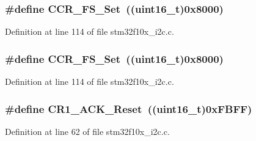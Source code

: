 \subsubsection[{\texorpdfstring{C\+C\+R\+\_\+\+F\+S\+\_\+\+Set}{CCR_FS_Set}}]{\setlength{\rightskip}{0pt plus 5cm}\#define C\+C\+R\+\_\+\+F\+S\+\_\+\+Set~(({\bf uint16\+\_\+t})0x8000)}\hypertarget{group___i2_c___private___defines_ga3af49180596b283514782708ac85606e}{}\label{group___i2_c___private___defines_ga3af49180596b283514782708ac85606e}


Definition at line 114 of file stm32f10x\+\_\+i2c.\+c.

\subsubsection[{\texorpdfstring{C\+C\+R\+\_\+\+F\+S\+\_\+\+Set}{CCR_FS_Set}}]{\setlength{\rightskip}{0pt plus 5cm}\#define C\+C\+R\+\_\+\+F\+S\+\_\+\+Set~(({\bf uint16\+\_\+t})0x8000)}\hypertarget{group___i2_c___private___defines_ga3af49180596b283514782708ac85606e}{}\label{group___i2_c___private___defines_ga3af49180596b283514782708ac85606e}


Definition at line 114 of file stm32f10x\+\_\+i2c.\+c.

\subsubsection[{\texorpdfstring{C\+R1\+\_\+\+A\+C\+K\+\_\+\+Reset}{CR1_ACK_Reset}}]{\setlength{\rightskip}{0pt plus 5cm}\#define C\+R1\+\_\+\+A\+C\+K\+\_\+\+Reset~(({\bf uint16\+\_\+t})0x\+F\+B\+F\+F)}\hypertarget{group___i2_c___private___defines_gaa8bcbe2f6089d896aff8e7770368aada}{}\label{group___i2_c___private___defines_gaa8bcbe2f6089d896aff8e7770368aada}


Definition at line 62 of file stm32f10x\+\_\+i2c.\+c.

